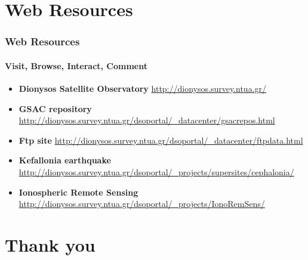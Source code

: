 \documentclass{beamer}
\begin{document}
\section{Web Resources}

\begin{frame}\frametitle{Web Resources}\framesubtitle{Visit, Browse, Interact, Comment}
\begin{itemize}
    \item \textbf{Dionysos Satellite Observatory} \url{http://dionysos.survey.ntua.gr/}  %
    \item \textbf{GSAC repository} \url{http://dionysos.survey.ntua.gr/dsoportal/_datacenter/gsacrepos.html} %
    \item \textbf{Ftp site} \url{http://dionysos.survey.ntua.gr/dsoportal/_datacenter/ftpdata.html}  %
    \item \textbf{Kefallonia earthquake} \url{http://dionysos.survey.ntua.gr/dsoportal/_projects/supersites/cephalonia/}  %
    \item \textbf{Ionospheric Remote Sensing} \url{http://dionysos.survey.ntua.gr/dsoportal/_projects/IonoRemSens/}  %
\end{itemize}
\end{frame}

\section{Thank you}
\end{document}
